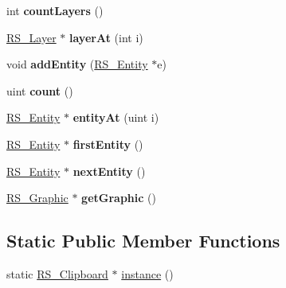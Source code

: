 \begin{DoxyCompactItemize}
\item 
\hypertarget{classRS__Clipboard_a10d353c17ea3f939314b368894181338}{int {\bfseries count\-Layers} ()}\label{classRS__Clipboard_a10d353c17ea3f939314b368894181338}

\item 
\hypertarget{classRS__Clipboard_ae5380080d181b2b8dacb353e2b2c389b}{\hyperlink{classRS__Layer}{R\-S\-\_\-\-Layer} $\ast$ {\bfseries layer\-At} (int i)}\label{classRS__Clipboard_ae5380080d181b2b8dacb353e2b2c389b}

\item 
\hypertarget{classRS__Clipboard_a2511f1a4c96ec0423f27ada0483cbf7d}{void {\bfseries add\-Entity} (\hyperlink{classRS__Entity}{R\-S\-\_\-\-Entity} $\ast$e)}\label{classRS__Clipboard_a2511f1a4c96ec0423f27ada0483cbf7d}

\item 
\hypertarget{classRS__Clipboard_a059d99bc518088e938f4ff33260d1cf6}{uint {\bfseries count} ()}\label{classRS__Clipboard_a059d99bc518088e938f4ff33260d1cf6}

\item 
\hypertarget{classRS__Clipboard_a668733e0cfa422a3c7a7d4639a7c5a89}{\hyperlink{classRS__Entity}{R\-S\-\_\-\-Entity} $\ast$ {\bfseries entity\-At} (uint i)}\label{classRS__Clipboard_a668733e0cfa422a3c7a7d4639a7c5a89}

\item 
\hypertarget{classRS__Clipboard_ac361e93ab6a9edc429b1acd369889cff}{\hyperlink{classRS__Entity}{R\-S\-\_\-\-Entity} $\ast$ {\bfseries first\-Entity} ()}\label{classRS__Clipboard_ac361e93ab6a9edc429b1acd369889cff}

\item 
\hypertarget{classRS__Clipboard_a99ab45e14a718c1e260587c384f55e49}{\hyperlink{classRS__Entity}{R\-S\-\_\-\-Entity} $\ast$ {\bfseries next\-Entity} ()}\label{classRS__Clipboard_a99ab45e14a718c1e260587c384f55e49}

\item 
\hypertarget{classRS__Clipboard_ab85dd0ef4bb970b6324181057c2506ae}{\hyperlink{classRS__Graphic}{R\-S\-\_\-\-Graphic} $\ast$ {\bfseries get\-Graphic} ()}\label{classRS__Clipboard_ab85dd0ef4bb970b6324181057c2506ae}

\end{DoxyCompactItemize}
\subsection*{Static Public Member Functions}
\begin{DoxyCompactItemize}
\item 
static \hyperlink{classRS__Clipboard}{R\-S\-\_\-\-Clipboard} $\ast$ \hyperlink{classRS__Clipboard_aadc45a00a001dae18df21f3cbf74628a}{instance} ()
\end{DoxyCompactItemize}
